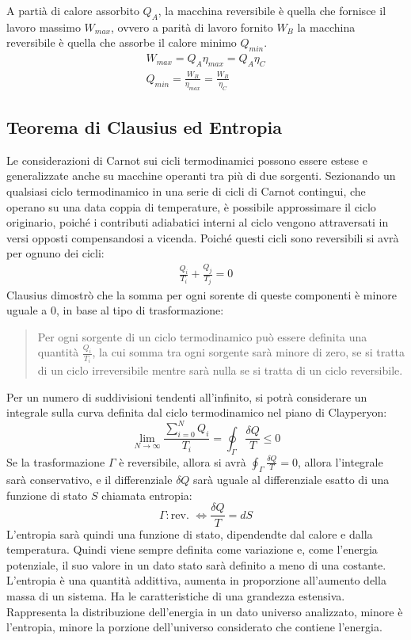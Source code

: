 \documentclass{article}
\numberwithin{equation}{subsection}
\begin{document}
A partià di calore assorbito $Q_A$, la macchina reversibile è quella che fornisce il lavoro massimo $W_{max}$, ovvero a parità di lavoro fornito $W_B$ la macchina reversibile è quella che assorbe 
il calore minimo $Q_{min}$. 
\begin{gather*}
    W_{max}=Q_A\eta_{max}=Q_A\eta_C\\
    Q_{min}=\displaystyle\frac{W_B}{\eta_{max}}=\frac{W_B}{\eta_C}
\end{gather*}

\subsection{Teorema di Clausius ed Entropia}

Le considerazioni di Carnot sui cicli termodinamici possono essere estese e generalizzate anche su macchine operanti tra più di due sorgenti. Sezionando un qualsiasi ciclo 
termodinamico in una serie di cicli di Carnot contingui, che operano su una data coppia di temperature, è possibile approssimare il ciclo originario, poiché i contributi 
adiabatici interni al ciclo vengono attraversati in versi opposti compensandosi a vicenda. Poiché questi cicli sono reversibili si avrà per ognuno dei cicli:
\begin{gather*}
    \displaystyle\frac{Q_i}{T_i}+\frac{Q_j}{T_j}=0
\end{gather*}
Clausius dimostrò che la somma per ogni sorente di queste componenti è minore uguale a $0$, in base al tipo di trasformazione: 
\begin{quotation}
    Per ogni sorgente di un ciclo termodinamico può essere definita una quantità $\displaystyle\frac{Q_i}{T_i}$, la cui somma tra ogni sorgente sarà minore di zero, se si tratta di un 
    ciclo irreversibile mentre sarà nulla se si tratta di un ciclo reversibile. 
\end{quotation}
Per un numero di suddivisioni tendenti all'infinito, si potrà considerare un integrale sulla curva 
definita dal ciclo termodinamico nel piano di Clayperyon:
\begin{equation*}
    \lim_{N\to\infty}\displaystyle\frac{\sum_{i=0}^NQ_i}{T_i}=\oint_{\Gamma}\frac{\delta Q}{T}\leq0
\end{equation*}
Se la trasformazione $\Gamma$ è reversibile, allora si avrà $\displaystyle\oint_{\Gamma}\frac{\delta Q}{T}=0$, allora l'integrale sarà conservativo, e 
il differenziale $\delta Q$ sarà uguale al differenziale esatto di una funzione di stato $S$ chiamata entropia:
\begin{equation}
    \Gamma:\mbox{rev. }\iff\displaystyle\frac{\delta Q}{T} =dS
\end{equation} 
L'entropia sarà quindi una funzione di stato, dipendendte dal calore e dalla temperatura. Quindi viene sempre definita come variazione e, come l'energia potenziale, il suo 
valore in un dato stato sarà definito a meno di una costante. 
L'entropia è una quantità addittiva, aumenta in proporzione all'aumento della massa di un sistema. Ha le caratteristiche di una grandezza estensiva. Rappresenta 
la distribuzione dell'energia in un dato universo analizzato, minore è l'entropia, minore la porzione dell'universo considerato che contiene l'energia. 
\end{document}

